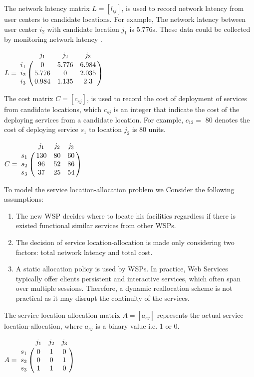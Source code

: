 \documentclass{llncs}
\let\bbordermatrix\bordermatrix
\begin{document}
The network latency matrix $L = [l_{ij}]$, is used to record network latency from user centers to 
candidate locations. For example, The network latency between user center $i_{2}$ with candidate location $j_{1}$ 
is 5.776s. These data could be collected by monitoring network latency \cite{6076756} \cite{5552800}.
\begin{center}
$
L = \bbordermatrix{~ & j_{1} & j_{2} & j_{3} \cr
					i_{1}	&0 &5.776 &6.984	\cr
					i_{2}	&5.776  &0 &2.035 \cr
					i_{3}	&0.984 &1.135	&2.3 \cr}
$
\end{center}

The cost matrix $C = [c_{sj}]$, is used to record the cost of deployment of services from candidate locations, 
which $c_{sj}$ is an integer that indicate the cost of the deploying services from a candidate location. 
For example, $c_{12} = $ 80 denotes the cost of deploying service $s_{1}$ to location $j_{2}$ is 80 units.
\begin{center}
$
C = \bbordermatrix{~ & j_{1} & j_{2} & j_{3}\cr
					s_{1}	&130 &80 &60\cr
					s_{2}	&96  &52 &86\cr
					s_{3}	&37 &25 &54\cr}
$
\end{center}



To model the service location-allocation problem we Consider the following assumptions:
\begin{enumerate}
	\item The new WSP decides where to locate his facilities regardless if there is existed functional similar services from other WSPs.
	\item The decision of service location-allocation is made only considering two factors: total network latency and total cost.
	\item A static allocation policy is used by WSPs. In practice, Web Services typically offer clients persistent and interactive services, which often span over multiple sessions. Therefore, a dynamic reallocation scheme is not practical as it may disrupt the continuity of the services.
\end{enumerate}


The service location-allocation matrix $A = [a_{sj}]$ represents the actual service location-allocation, where $a_{sj}$  is a binary value i.e. 1 or 0.
\begin{center}
$
A = \bbordermatrix{~ & j_{1} & j_{2} & j_{3}\cr
					s_{1}	&0 &1 &0	\cr
					s_{2}	&0  &0 &1	\cr
					s_{3}	&1 &1 &0	\cr}
$
\end{center}
\end{document}
